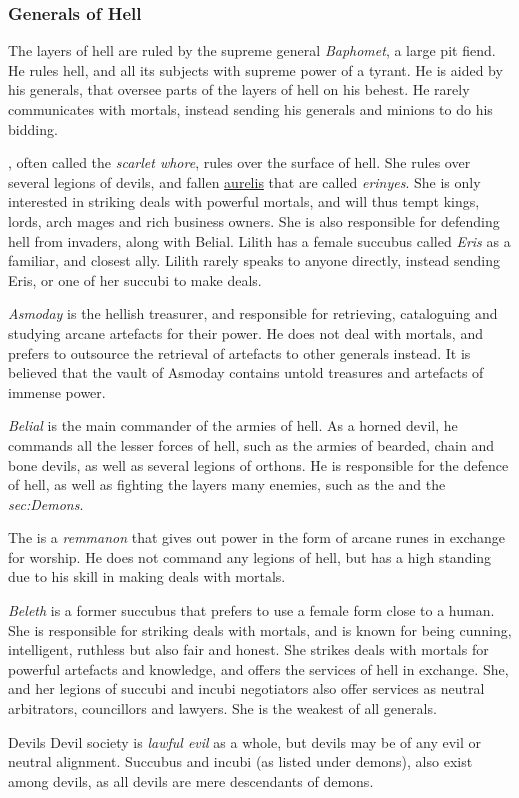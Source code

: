 \subsubsection{Generals of Hell}

The layers of hell are ruled by the supreme general \emph{Baphomet}, a large
pit fiend. He rules hell, and all its subjects with supreme power of a
tyrant. He is aided by his generals, that oversee parts of the layers of
hell on his behest. He rarely communicates with mortals, instead sending his
generals and minions to do his bidding.

, often called the \emph{scarlet whore}, rules over the
surface of hell. She rules over several legions of devils, and fallen
\hyperref[sec:Aurelis]{aurelis} that are called \emph{erinyes}. She is only
interested in striking deals with powerful mortals, and will thus tempt kings,
lords, arch mages and rich business owners. She is also responsible for
defending hell from invaders, along with Belial. Lilith has a female succubus
called \emph{Eris} as a familiar, and closest ally. Lilith rarely speaks to
anyone directly, instead sending Eris, or one of her succubi to make deals.

\emph{Asmoday} is the hellish treasurer, and responsible for retrieving,
cataloguing and studying arcane artefacts for their power. He does not deal
with mortals, and prefers to outsource the retrieval of artefacts to other
generals instead. It is believed that the vault of Asmoday contains untold
treasures and artefacts of immense power.

\emph{Belial} is the main commander of the armies of hell. As a horned devil,
he commands all the lesser forces of hell, such as the armies of bearded,
chain and bone devils, as well as several legions of orthons. He is
responsible for the defence of hell, as well as fighting the layers many
enemies, such as the  and the \emph{sec:Demons}.

The  is a \emph{remmanon} that gives out power in the
form of arcane runes in exchange for worship. He does not command any legions
of hell, but has a high standing due to his skill in making deals with mortals.

\emph{Beleth} is a former succubus that prefers to use a female form close to
a human. She is responsible for striking deals with mortals, and is known for
being cunning, intelligent, ruthless but also fair and honest. She strikes
deals with mortals for powerful artefacts and knowledge, and offers the
services of hell in exchange. She, and her legions of succubi and incubi
negotiators also offer services as neutral arbitrators, councillors and
lawyers. She is the weakest of all generals.

\begin{35e}{Devils}
  Devil society is \emph{lawful evil} as a whole, but devils may be of any
  evil or neutral alignment. Succubus and incubi (as listed under demons),
  also exist among devils, as all devils are mere descendants of demons.
\end{35e}

